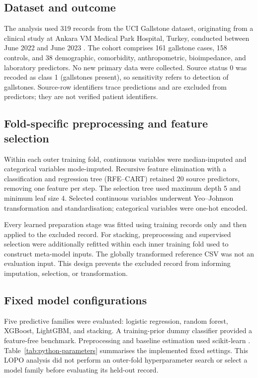 \subsection{Dataset and outcome}
The analysis used 319 records from the UCI Gallstone dataset, originating from a clinical study at Ankara VM Medical Park Hospital, Turkey, conducted between June 2022 and June 2023 \parencite{esen2024early,uci2025gallstone}. The cohort comprises 161 gallstone cases, 158 controls, and 38 demographic, comorbidity, anthropometric, bioimpedance, and laboratory predictors. No new primary data were collected. Source status 0 was recoded as class 1 (gallstones present), so sensitivity refers to detection of gallstones. Source-row identifiers trace predictions and are excluded from predictors; they are not verified patient identifiers.

\subsection{Fold-specific preprocessing and feature selection}
Within each outer training fold, continuous variables were median-imputed and categorical variables mode-imputed. Recursive feature elimination with a classification and regression tree (RFE--CART) retained 20 source predictors, removing one feature per step. The selection tree used maximum depth 5 and minimum leaf size 4. Selected continuous variables underwent Yeo--Johnson transformation \parencite{yeo2000new} and standardisation; categorical variables were one-hot encoded.

Every learned preparation stage was fitted using training records only and then applied to the excluded record. For stacking, preprocessing and supervised selection were additionally refitted within each inner training fold used to construct meta-model inputs. The globally transformed reference CSV was not an evaluation input. This design prevents the excluded record from informing imputation, selection, or transformation.

\subsection{Fixed model configurations}
Five predictive families were evaluated: logistic regression, random forest, XGBoost, LightGBM, and stacking. A training-prior dummy classifier provided a feature-free benchmark. Preprocessing and baseline estimation used scikit-learn \parencite{pedregosa2011scikit}. Table~\ref{tab:python-parameters} summarises the implemented fixed settings. This LOPO analysis did not perform an outer-fold hyperparameter search or select a model family before evaluating its held-out record.

